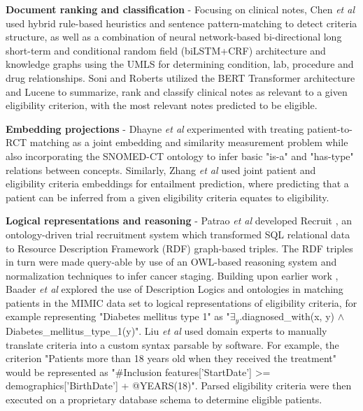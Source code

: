 \documentclass[../main.tex]{subfiles}
\begin{document}
\textbf{Document ranking and classification} - Focusing on clinical notes, Chen \textit{et al} \cite{chen2019clinical} used hybrid rule-based heuristics and sentence pattern-matching to detect criteria structure, as well as a combination of neural network-based bi-directional long short-term and conditional random field (biLSTM+CRF) architecture and knowledge graphs using the UMLS for determining condition, lab, procedure and drug relationships. Soni and Roberts \cite{soni2020patient} utilized the BERT Transformer architecture \cite{devlin2018bert} and Lucene \cite{lucene} to summarize, rank and classify clinical notes as relevant to a given eligibility criterion, with the most relevant notes predicted to be eligible. 

\textbf{Embedding projections} - Dhayne \textit{et al} \cite{dhayne2021emr2vec} experimented with treating patient-to-RCT matching as a joint embedding and similarity measurement problem while also incorporating the SNOMED-CT ontology to infer basic "is-a" and "has-type" relations between concepts. Similarly, Zhang \textit{et al} \cite{zhang2020deepenroll} used joint patient and eligibility criteria embeddings for entailment prediction, where predicting that a patient can be inferred from a given eligibility criteria equates to eligibility. 

\textbf{Logical representations and reasoning} - Patrao \textit{et al} developed Recruit \cite{patrao2015recruit}, an ontology-driven trial recruitment system which transformed SQL relational data to Resource Description Framework (RDF) graph-based triples. The RDF triples in turn were made query-able by use of an OWL-based reasoning system \cite{owl} and normalization techniques to infer cancer staging. Building upon earlier work \cite{patel2007matching, tu2009ergo, huang2013semanticct}, Baader \textit{et al} \cite{baader2018patient} explored the use of Description Logics and ontologies in matching patients in the MIMIC data set to logical representations of eligibility criteria, for example representing "Diabetes mellitus type 1" as "$\exists_y$.diagnosed\_with(x, y) $\wedge$ Diabetes\_mellitus\_type\_1(y)". Liu \textit{et al} \cite{liu2021evaluating} used domain experts to manually translate criteria into a custom syntax parsable by software. For example, the criterion "Patients more than 18 years old when they received the treatment" would be represented as "\#Inclusion features['StartDate'] >= demographics['BirthDate'] + @YEARS(18)". Parsed eligibility criteria were then executed on a proprietary database schema to determine eligible patients.
\end{document}
